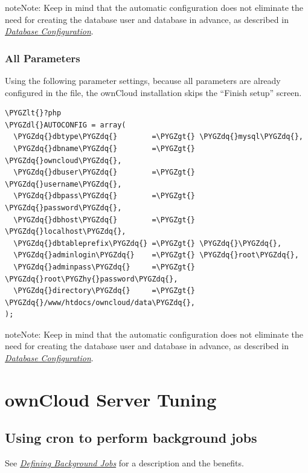 \documentclass[letterpaper,10pt,english]{sphinxmanual}
\def\PYGZlt{\char`\<}
\def\PYGZgt{\char`\>}
\def\PYGZdl{\char`\$}
\def\PYGZhy{\char`\-}
\def\PYGZdq{\char`\"}
\begin{document}
\begin{notice}{note}{Note:}
Keep in mind that the automatic configuration does not eliminate the need for
creating the database user and database in advance, as described in
{\hyperref[configuration_database/linux_database_configuration::doc]{\emph{Database Configuration}}}.
\end{notice}


\subsubsection{All Parameters}
\label{configuration_server/automatic_configuration:all-parameters}
Using the following parameter settings, because all parameters are already configured in the file, the ownCloud installation skips the ``Finish setup'' screen.

\begin{Verbatim}[commandchars=\\\{\}]
\PYGZlt{}?php
\PYGZdl{}AUTOCONFIG = array(
  \PYGZdq{}dbtype\PYGZdq{}        =\PYGZgt{} \PYGZdq{}mysql\PYGZdq{},
  \PYGZdq{}dbname\PYGZdq{}        =\PYGZgt{} \PYGZdq{}owncloud\PYGZdq{},
  \PYGZdq{}dbuser\PYGZdq{}        =\PYGZgt{} \PYGZdq{}username\PYGZdq{},
  \PYGZdq{}dbpass\PYGZdq{}        =\PYGZgt{} \PYGZdq{}password\PYGZdq{},
  \PYGZdq{}dbhost\PYGZdq{}        =\PYGZgt{} \PYGZdq{}localhost\PYGZdq{},
  \PYGZdq{}dbtableprefix\PYGZdq{} =\PYGZgt{} \PYGZdq{}\PYGZdq{},
  \PYGZdq{}adminlogin\PYGZdq{}    =\PYGZgt{} \PYGZdq{}root\PYGZdq{},
  \PYGZdq{}adminpass\PYGZdq{}     =\PYGZgt{} \PYGZdq{}root\PYGZhy{}password\PYGZdq{},
  \PYGZdq{}directory\PYGZdq{}     =\PYGZgt{} \PYGZdq{}/www/htdocs/owncloud/data\PYGZdq{},
);
\end{Verbatim}

\begin{notice}{note}{Note:}
Keep in mind that the automatic configuration does not eliminate the need for
creating the database user and database in advance, as described in
{\hyperref[configuration_database/linux_database_configuration::doc]{\emph{Database Configuration}}}.
\end{notice}


\section{ownCloud Server Tuning}
\label{configuration_server/oc_server_tuning::doc}\label{configuration_server/oc_server_tuning:owncloud-server-tuning}

\subsection{Using cron to perform background jobs}
\label{configuration_server/oc_server_tuning:using-cron-to-perform-background-jobs}
See {\hyperref[configuration_server/background_jobs_configuration::doc]{\emph{Defining Background Jobs}}} for a description and the
benefits.
\end{document}
